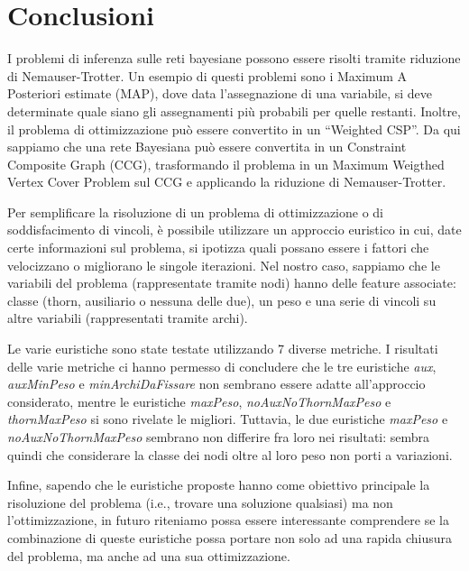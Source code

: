 \section{Conclusioni}
\label{sec:conclusioni}

I problemi di inferenza sulle reti bayesiane possono essere risolti tramite riduzione di Nemauser-Trotter. Un esempio di questi problemi sono i Maximum A Posteriori estimate (MAP), dove data l'assegnazione di una variabile, si deve determinate quale siano gli assegnamenti più probabili per quelle restanti. Inoltre, il problema di ottimizzazione può essere convertito in un ``Weighted CSP''. Da qui sappiamo che una rete Bayesiana può essere convertita in un Constraint Composite Graph (CCG), trasformando il problema in un Maximum Weigthed Vertex Cover Problem sul CCG e applicando la riduzione di Nemauser-Trotter.

Per semplificare la risoluzione di un problema di ottimizzazione o di soddisfacimento di vincoli, è possibile utilizzare un approccio euristico in cui, date certe informazioni sul problema, si ipotizza quali possano essere i fattori che velocizzano o migliorano le singole iterazioni. Nel nostro caso, sappiamo che le variabili del problema (rappresentate tramite nodi) hanno delle feature associate: classe (thorn, ausiliario o nessuna delle due), un peso e una serie di vincoli su altre variabili (rappresentati tramite archi).

Le varie euristiche sono state testate utilizzando 7 diverse metriche. I risultati delle varie metriche ci hanno permesso di concludere che le tre euristiche \textit{aux}, \textit{auxMinPeso} e \textit{minArchiDaFissare} non sembrano essere adatte all'approccio considerato, mentre le euristiche \textit{maxPeso}, \textit{noAuxNoThornMaxPeso}
 e \textit{thornMaxPeso} si sono rivelate le migliori. Tuttavia, le due euristiche \textit{maxPeso} e \textit{noAuxNoThornMaxPeso} sembrano non differire fra loro nei risultati: sembra quindi che considerare la classe dei nodi oltre al loro peso non porti a variazioni. 

Infine, sapendo che le euristiche proposte hanno come obiettivo principale la risoluzione del problema (i.e., trovare una soluzione qualsiasi) ma non l'ottimizzazione, in futuro riteniamo possa essere interessante comprendere se la combinazione di queste euristiche possa portare non solo ad una rapida chiusura del problema, ma anche ad una sua ottimizzazione.